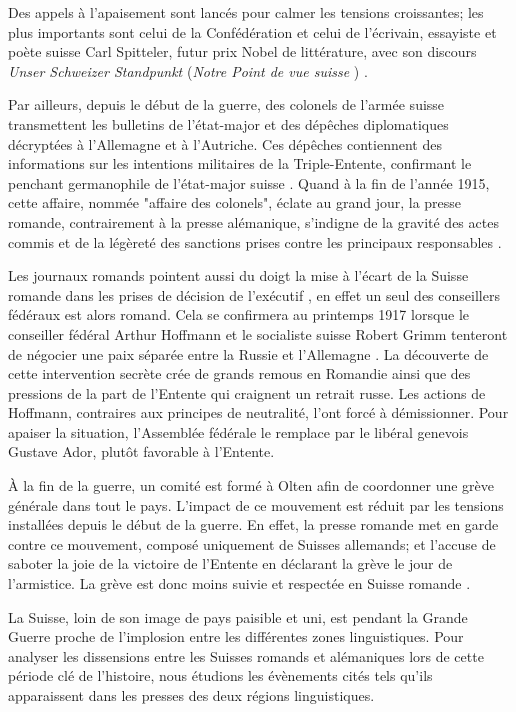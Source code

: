 \documentclass[french,a4paper]{article}
\begin{document}
Des appels à l’apaisement sont lancés pour calmer les tensions croissantes; les plus importants sont celui de la Confédération \cite{apaisement} et celui de l'écrivain, essayiste et poète suisse Carl Spitteler, futur prix Nobel de littérature, avec son discours \og \textit{Unser Schweizer Standpunkt} \fg{} (\og \textit{Notre Point de vue suisse} \fg{}) \cite{standpunkt} \cite{rede_spitteler}.

Par ailleurs, depuis le début de la guerre, des colonels de l'armée suisse transmettent les bulletins de l'état-major et des dépêches diplomatiques décryptées à l'Allemagne et à l'Autriche.
Ces dépêches contiennent des informations sur les intentions militaires de la Triple-Entente, confirmant le penchant germanophile de l'état-major suisse \cite{whistle_blower}.
Quand à la fin de l'année 1915, cette affaire, nommée "affaire des colonels", éclate au grand jour, la presse romande, contrairement à la presse alémanique, s'indigne de la gravité des actes commis et de la légèreté des sanctions prises contre les principaux responsables \cite{verdict}.

Les journaux romands pointent aussi du doigt la mise à l'écart de la Suisse romande dans les prises de décision de l'exécutif \cite{exclusion}, en effet un seul des conseillers fédéraux est alors romand.
Cela se confirmera au printemps 1917 lorsque le conseiller fédéral Arthur Hoffmann et le socialiste suisse Robert Grimm tenteront de négocier une paix séparée entre la Russie et l'Allemagne \cite{hoffmann}.
La découverte de cette intervention secrète crée de grands remous en Romandie ainsi que des pressions de la part de l'Entente qui craignent un retrait russe.
Les actions de Hoffmann, contraires aux principes de neutralité, l'ont forcé à démissionner.
Pour apaiser la situation, l'Assemblée fédérale le remplace par le libéral genevois Gustave Ador, plutôt favorable à l'Entente.

À la fin de la guerre, un comité est formé à Olten afin de coordonner une grève générale dans tout le pays.
L'impact de ce mouvement est réduit par les tensions installées depuis le début de la guerre.
En effet, la presse romande met en garde contre ce mouvement, composé uniquement de Suisses allemands; et l'accuse de saboter la joie de la victoire de l'Entente en déclarant la grève le jour de l'armistice.
La grève est donc moins suivie et respectée en Suisse romande \cite{sprachenfrieden}.

La Suisse, loin de son image de pays paisible et uni, est pendant la Grande Guerre proche de l'implosion entre les différentes zones linguistiques.
Pour analyser les dissensions entre les Suisses romands et alémaniques lors de cette période clé de l'histoire, nous étudions les évènements cités tels qu'ils apparaissent dans les presses des deux régions linguistiques.
\end{document}
